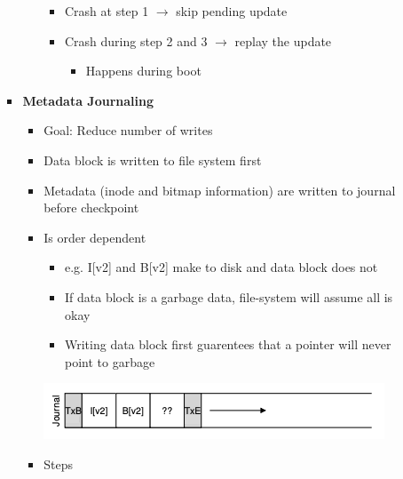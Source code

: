 \documentclass[12pt]{article}
\begin{document}
\begin{enumerate}[1.]
\begin{enumerate}[a)]
\begin{itemize}
\begin{itemize}
                \begin{itemize}
                    \item Crash at step 1 $\to$ skip pending update
                    \item Crash during step 2 and 3 $\to$ replay the update

                    \begin{itemize}
                        \item Happens during boot
                    \end{itemize}
                \end{itemize}
            \end{itemize}

            \item \textbf{Metadata Journaling}

            \begin{itemize}
                \item Goal: Reduce number of writes
                \item Data block is written to file system first
                \item Metadata (inode and bitmap information) are written to journal before checkpoint
                \item Is order dependent
                \begin{itemize}
                    \item e.g. I[v2] and B[v2] make to disk and data block does not
                    \item If data block is a garbage data, file-system will assume all is okay
                    \item Writing data block first guarentees that a pointer will never point to garbage
                \end{itemize}

                \begin{center}
                \includegraphics[width=0.8\linewidth]{../images/midterm_4_solution_40.png}
                \end{center}

                \item Steps


\end{itemize}
\end{itemize}
\end{enumerate}
\end{enumerate}
\end{document}
